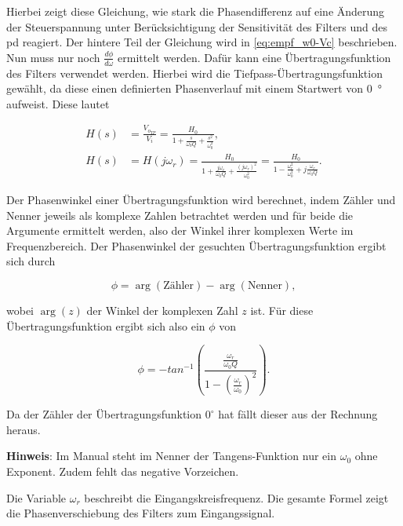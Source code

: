 \documentclass[../main.tex]{subfiles}
\begin{document}
Hierbei zeigt diese Gleichung, wie stark die Phasendifferenz auf eine Änderung der Steuerspannung unter Berücksichtigung der Sensitivität des Filters und des \gls{pd} reagiert. Der hintere Teil der Gleichung wird in \eqref{eq:empf_w0-Vc} beschrieben. Nun muss nur noch $\frac{d\phi}{d\omega}$ ermittelt werden. Dafür kann eine Übertragungsfunktion des Filters verwendet werden. Hierbei wird die Tiefpass-Übertragungsfunktion gewählt, da diese einen definierten Phasenverlauf mit einem Startwert von \SI{0}{\degree} aufweist. Diese lautet\par

\begin{align}
  H(s) &= \frac{V_{o_{TP}}}{V_i} = \frac{H_0}{1 + \frac{s}{\omega_0 Q} + \frac{s^2}{\omega_0^2}}, \label{eq:u_tp} \\
  H(s) &= H(j \omega_r) = \frac{H_0}{1 + \frac{j \omega_r}{\omega_0 Q} + \frac{(j \omega_r)^2}{\omega_0^2}} = \frac{H_0}{1 - \frac{ \omega_r^2}{\omega_0^2} + j\frac{\omega_r}{\omega_0 Q} }. \nonumber
\end{align}

Der Phasenwinkel einer Übertragungsfunktion wird berechnet, indem Zähler und Nenner jeweils als komplexe Zahlen betrachtet werden und für beide die Argumente ermittelt werden, also der Winkel ihrer komplexen Werte im Frequenzbereich. Der Phasenwinkel der gesuchten Übertragungsfunktion ergibt sich durch

\begin{equation}
  \phi = \arg(\text{Zähler}) - \arg(\text{Nenner}),
\end{equation}

wobei $\arg(z)$ der Winkel der komplexen Zahl $z$ ist. Für diese Übertragungsfunktion ergibt sich also ein $\phi$ von

\begin{equation}
  \phi = -tan^{-1} \left(\frac{\frac{\omega_r}{\omega_0 Q}}{1- (\frac{\omega_r}{\omega_0}) ^2}\right).
\end{equation}

Da der Zähler der Übertragungsfunktion $0^\circ$ hat fällt dieser aus der Rechnung heraus. \par
\medskip

\textbf{Hinweis}: Im Manual steht im Nenner der Tangens-Funktion nur ein $\omega_0$ ohne Exponent. Zudem fehlt das negative Vorzeichen.\par
\medskip

Die Variable $\omega_r$ beschreibt die Eingangskreisfrequenz. Die gesamte Formel zeigt die Phasenverschiebung des Filters zum Eingangssignal.\par
\end{document}
